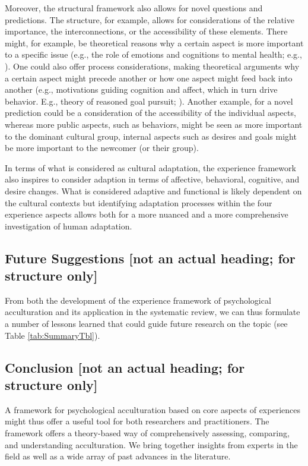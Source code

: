 \documentclass[man, 12pt, a4paper]{apa7}
\begin{document}
Moreover, the structural framework also allows for novel questions and predictions. The structure, for example, allows for considerations of the relative importance, the interconnections, or the accessibility of these elements. There might, for example, be theoretical reasons why a certain aspect is more important to a specific issue (e.g., the role of emotions and cognitions to mental health; e.g., \citealp{Crocker2013}). One could also offer process considerations, making theoretical arguments why a certain aspect might precede another or how one aspect might feed back into another (e.g., motivations guiding cognition and affect, which in turn drive behavior. E.g., theory of reasoned goal pursuit; \citealp{Ajzen2019}). Another example, for a novel prediction could be a consideration of the accessibility of the individual aspects, whereas more public aspects, such as behaviors, might be seen as more important to the dominant cultural group, internal aspects such as desires and goals might be more important to the newcomer (or their group).

In terms of what is considered as cultural adaptation, the experience framework also inspires to consider adaption in terms of affective, behavioral, cognitive, and desire changes. What is considered adaptive and functional is likely dependent on the cultural contexts but identifying adaptation processes within the four experience aspects allows both for a more nuanced and a more comprehensive investigation of human adaptation.

\subsection{Future Suggestions [not an actual heading; for structure only]}
From both the development of the experience framework of psychological acculturation and its application in the systematic review, we can thus formulate a number of lessons learned that could guide future research on the topic (see Table \ref{tab:SummaryTbl}).



\subsection{Conclusion [not an actual heading; for structure only]}
A framework for psychological acculturation based on core aspects of experiences might thus offer a useful tool for both researchers and practitioners. The framework offers a theory-based way of comprehensively assessing, comparing, and understanding acculturation. We bring together insights from experts in the field as well as a wide array of past advances in the literature.
\end{document}
